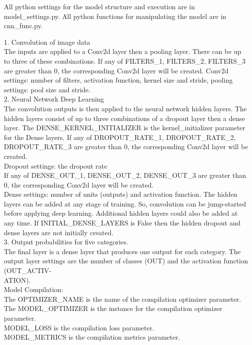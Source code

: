 All python settings for the model structure and execution are in model\_settings.py. All python functions for manipulating the model are in cnn\_func.py.

1.	Convolution of image data \\

The inputs are applied to a Conv2d layer then a pooling layer. There can be up to three of these combinations.
If any of FILTERS\_1, FILTERS\_2, FILTERS\_3 are greater than 0, the corresponding Conv2d layer will be created. Conv2d settings: number of filters, activation function, kernel size and stride, pooling settings: pool size and stride. \\
	
2.	Neural Network Deep Learning \\

The convolution outputs is then applied to the neural network hidden layers. The hidden layers consist of up to three combinations of a dropout layer then a dense layer. The DENSE\_KERNEL\_INITIALIZER is the kernel\_initializer parameter for the Dense layers. If any of DROPOUT\_RATE\_1, DROPOUT\_RATE\_2, DROPOUT\_RATE\_3 are greater than 0, the corresponding Conv2d layer will be created. \\

Dropout settings: the dropout rate\\
If any of DENSE\_OUT\_1, DENSE\_OUT\_2, DENSE\_OUT\_3 are greater than 0, the corresponding Conv2d layer will be created. \\

Dense settings: number of units (outputs) and activation function. The hidden layers can be added at any stage of training. So, convolution can be jump-started before applying deep learning. Additional hidden layers could also be added at any time. If INITIAL\_DENSE\_LAYERS is False then the hidden dropout and dense layers are not initially created. \\

3.	Output probabilities for five categories. \\

The final layer is a dense layer that produces one output for each category. The output layer settings are the number of classes (OUT) and the activation function (OUT\_ACTIV- \\ ATION). \\

Model Compilation: \\
The OPTIMIZER\_NAME is the name of the compilation optimizer parameter. \\
The MODEL\_OPTIMIZER is the instance for the compilation optimizer parameter. \\
MODEL\_LOSS is the compilation loss parameter. \\
MODEL\_METRICS is the compilation metrics parameter. \\

